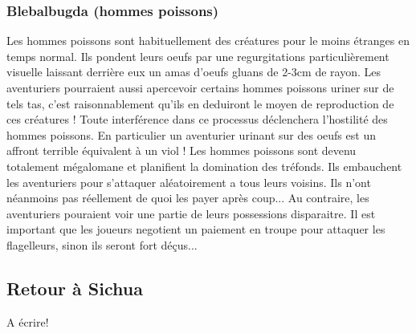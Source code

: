 \subsubsection*{Blebalbugda (hommes poissons)}

Les hommes poissons sont habituellement des créatures pour le moins étranges en temps 
normal. Ils pondent leurs oeufs par une regurgitations particulièrement visuelle laissant 
derrière eux un amas d'oeufs gluans de 2-3cm de rayon. Les aventuriers pourraient aussi 
apercevoir certains hommes poissons uriner sur de tels tas, c'est raisonnablement qu'ils 
en deduiront le moyen de reproduction de ces créatures !  Toute interférence dans ce 
processus déclenchera l'hostilité des hommes poissons. En particulier un aventurier 
urinant sur des oeufs est un affront terrible équivalent à un viol ! Les hommes poissons 
sont devenu totalement mégalomane et planifient la domination des tréfonds. Ils embauchent 
les aventuriers pour s'attaquer aléatoirement a tous leurs voisins. Ils n'ont néanmoins 
pas réellement de quoi les payer après coup... Au contraire, les aventuriers pouraient voir 
une partie de leurs possessions disparaitre. Il est important que les joueurs negotient
un paiement en troupe pour attaquer les flagelleurs, sinon ils seront fort déçus...

\subsection{Retour à Sichua}

A écrire!
